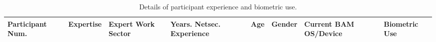 \begin{table*}[t]
    \centering
    \small
    \setlength{\extrarowsep}{6pt}
\caption{Details of participant experience and biometric use.}
\label{tab:part_details}
    \begin{tabu} to \linewidth { X[c] | X[c] | X[c] | X[c] | X[c] | X[c] | X[c] |X[c]  }\\
Participant Num. & Expertise & Expert Work Sector & Years. Netsec. Experience & Age & Gender & Current BAM OS/Device & Biometric Use  \\
\hline



\end{tabu}
\end{table*}
